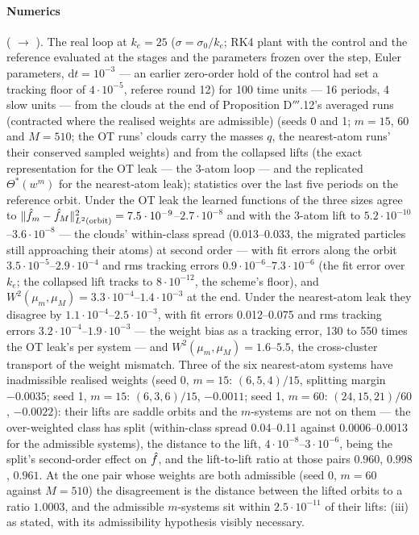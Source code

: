 \paragraph{Numerics} ( $\to$ ). The real loop at
$k_e = 25$ ($\sigma = \sigma_0/k_e$; RK4 plant with the control and the reference evaluated at the stages and the
parameters frozen over the step, Euler parameters, $\mathrm{d}t = 10^{-3}$ --- an earlier zero-order hold of the
control had set a tracking floor of $4\cdot10^{-5}$, referee round 12) for 100 time units --- 16 periods, 4 slow
units --- from the clouds at the end of Proposition D$'''$.12's averaged runs (contracted where the realised
weights are admissible) (seeds 0 and 1; $m = 15$, $60$ and $M = 510$; the OT runs' clouds carry the masses $q$, the
nearest-atom runs' their conserved sampled weights) and from the collapsed lifts (the exact representation for the OT leak --- the 3-atom loop --- and the
replicated $\Theta^*(w^m)$ for the nearest-atom leak); statistics over the last five periods on the reference
orbit. Under the OT leak the learned functions of the three sizes agree to
$\lVert \hat f_m - \hat f_M\rVert^2_{L^2(\mathrm{orbit})} = 7.5\cdot10^{-9}$--$2.7\cdot10^{-8}$ and with the 3-atom lift to
$5.2\cdot10^{-10}$--$3.6\cdot10^{-8}$ --- the clouds' within-class spread (0.013--0.033, the migrated particles still
approaching their atoms) at second order --- with fit errors along the orbit $3.5\cdot10^{-5}$--$2.9\cdot10^{-4}$
and rms tracking errors $0.9\cdot10^{-6}$--$7.3\cdot10^{-6}$ (the fit error over $k_e$; the collapsed lift tracks
to $8\cdot10^{-12}$, the scheme's floor), and $W^2(\mu_m,\mu_M) = 3.3\cdot10^{-4}$--$1.4\cdot10^{-3}$ at the end.
Under the nearest-atom leak they disagree by $1.1\cdot10^{-4}$--$2.5\cdot10^{-3}$, with fit errors 0.012--0.075 and
rms tracking errors $3.2\cdot10^{-4}$--$1.9\cdot10^{-3}$ --- the weight bias as a tracking error, 130 to 550 times
the OT leak's per system --- and $W^2(\mu_m,\mu_M) = 1.6$--$5.5$, the cross-cluster transport of the weight
mismatch. Three of
the six nearest-atom systems have inadmissible realised weights (seed 0, $m = 15$: $(6,5,4)/15$, splitting margin
$-0.0035$; seed 1, $m = 15$: $(6,3,6)/15$, $-0.0011$; seed 1, $m = 60$: $(24,15,21)/60$, $-0.0022$): their lifts are
saddle orbits and the $m$-systems are not on them --- the over-weighted class has split (within-class spread
0.04--0.11 against 0.0006--0.0013 for the admissible systems), the distance to the lift,
$4\cdot10^{-8}$--$3\cdot10^{-6}$, being the split's second-order effect on $\hat f$, and the lift-to-lift ratio at
those pairs $0.960$, $0.998$, $0.961$. At the one pair whose weights are both admissible (seed 0, $m = 60$ against
$M = 510$) the disagreement is the distance between the lifted orbits to a ratio $1.0003$, and the admissible
$m$-systems sit within $2.5\cdot10^{-11}$ of their lifts: (iii) as stated, with its admissibility hypothesis visibly
necessary.

